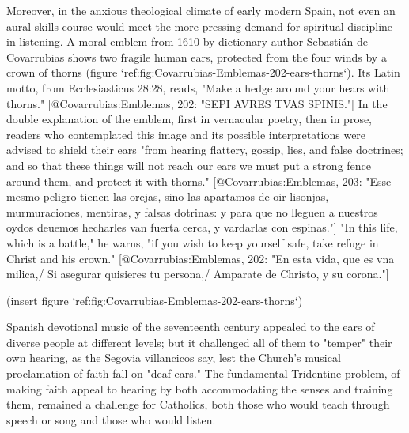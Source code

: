 Moreover, in the anxious theological climate of early modern Spain, not even an
aural-skills course would meet the more pressing demand for spiritual discipline
in listening.
A moral emblem from 1610 by dictionary author Sebastián de Covarrubias shows two
fragile human ears, protected from the four winds by a crown of thorns
(figure `ref:fig:Covarrubias-Emblemas-202-ears-thorns`). 
Its Latin motto, from Ecclesiasticus 28:28, reads, "Make a hedge around your
hears with thorns."
[@Covarrubias:Emblemas, 202: "SEPI AVRES TVAS SPINIS."]
In the double explanation of the emblem, first in vernacular poetry, then in
prose, readers who contemplated this image and its possible interpretations were
advised to shield their ears "from hearing flattery, gossip, lies, and false
doctrines; and so that these things will not reach our ears we must
put a strong fence around them, and protect it with thorns."
[@Covarrubias:Emblemas, 203: "Esse mesmo peligro tienen las orejas, sino las
apartamos de oir lisonjas, murmuraciones, mentiras, y falsas dotrinas: y para
que no lleguen a nuestros oydos deuemos hecharles van fuerta cerca, y vardarlas
con espinas."]
"In this life, which is a battle," he warns, "if you wish to keep yourself safe,
take refuge in Christ and his crown."
[@Covarrubias:Emblemas, 202: "En esta vida, que es vna milica,/ Si asegurar
quisieres tu persona,/ Amparate de Christo, y su corona."]

(insert figure `ref:fig:Covarrubias-Emblemas-202-ears-thorns`)
\label{fig:Covarrubias-Emblemas-202-ears-thorns}

Spanish devotional music of the seventeenth century appealed to the ears of
diverse people at different levels; but it challenged all of them to "temper"
their own hearing, as the Segovia villancicos say, lest the Church's musical
proclamation of faith fall on "deaf ears."
The fundamental Tridentine problem, of making faith appeal to hearing by both
accommodating the senses and training them, remained a challenge for Catholics,
both those who would teach through speech or song and those who would listen. 

